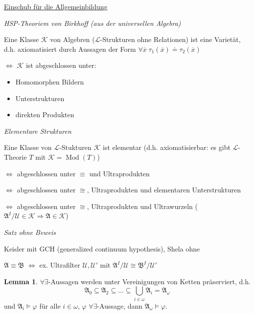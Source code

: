 \documentclass[12pt,parskip=full]{scrartcl}
\newcommand{\heading}{\underline}
\theoremstyle{definition}
\newtheorem{lemma}[theorem]{Lemma}
\begin{document}
	\heading{Einschub für die Allgemeinbildung}
	
	\textit{HSP-Theoriem von Birkhoff (aus der universellen Algebra)}
	
	Eine Klasse $\mathcal{K}$ von Algebren ($\mathcal{L}$-Strukturen ohne Relationen) ist eine Varietät, d.h. axiomatisiert durch Aussagen der Form $\forall \overline{x} \; \tau_1(\overline{x}) \doteq \tau_2(\overline{x})$
	
	$\Leftrightarrow$ $\mathcal{K}$ ist abgeschlossen unter:
	\begin{itemize}
		\item Homomorphen Bildern
		\item Unterstrukturen
		\item direkten Produkten
	\end{itemize}

	\textit{Elementare Strukturen}
	
	Eine Klasse von $\mathcal{L}$-Stukturen $\mathcal{K}$ ist elementar (d.h. axiomatisierbar: es gibt $\mathcal{L}$-Theorie $T$ mit $\mathcal{K} = \operatorname{Mod}(T)$)
	
	$\Leftrightarrow$ abgeschlossen unter $\equiv$ und Ultraprodukten
	
	$\Leftrightarrow$ abgeschlossen unter $\cong$, Ultraprodukten und elementaren Unterstrukturen
	
	$\Leftrightarrow$ abgeschlossen unter $\cong$, Ultraprodukten und Ultrawurzeln ($\mathfrak{A}^I/\mathcal{U} \in \mathcal{K} \Rightarrow \mathfrak{A} \in \mathcal{K}$)
	
	\textit{Satz ohne Beweis}
	
	Keisler mit GCH (generalized continuum hypothesis), Shela ohne
	
	$\mathfrak{A} \equiv \mathfrak{B}$ $\Leftrightarrow$ ex. Ultrafilter $\mathcal{U}, \mathcal{U}'$ mit $\mathfrak{A}^I/\mathcal{U} \cong \mathfrak{B}^I/\mathcal{U}'$
	
	\begin{lemma}
		$\forall \exists$-Aussagen werden unter Vereinigungen von Ketten präserviert, d.h.
		\begin{equation*}
			\mathfrak{A}_0 \subseteq \mathfrak{A}_2 \subseteq \dots \subseteq \bigcup_{i \in \omega} \mathfrak{A}_i = \mathfrak{A}_\omega
		\end{equation*}
		und $\mathfrak{A}_i \models \varphi$ für alle $i \in \omega$, $\varphi$ $\forall \exists$-Aussage, dann $\mathfrak{A}_\omega \models \varphi$.
	\end{lemma}
\end{document}
